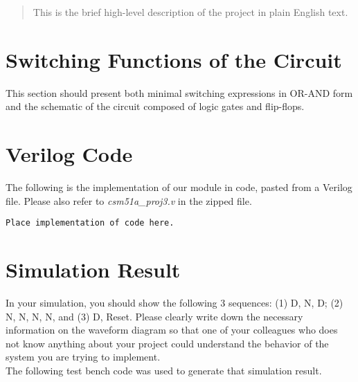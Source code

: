 \documentclass{article}
\begin{document}
\begin{abstract}
This is the brief high-level description of the project in plain English text.
\end{abstract}


\section{Switching Functions of the Circuit}
This section should present both minimal switching expressions in OR-AND form 
and the schematic of the circuit composed of logic gates and flip-flops.


\section{Verilog Code}
The following is the implementation of our module in code, pasted from a 
Verilog file. Please also refer to \textit{csm51a\_proj3.v} in the zipped 
file.\\

\begin{verbatim}
Place implementation of code here.
\end{verbatim}


\section{Simulation Result}
In your simulation, you should show the following 3 sequences: (1) D, N, D;
(2) N, N, N, N, and (3) D, Reset. Please clearly write down the necessary 
information on the waveform diagram so that one of your colleagues who does 
not know anything about your project could understand the behavior of the 
system you are trying to implement.\\

The following test bench code was used to generate that simulation result.
\end{document}
